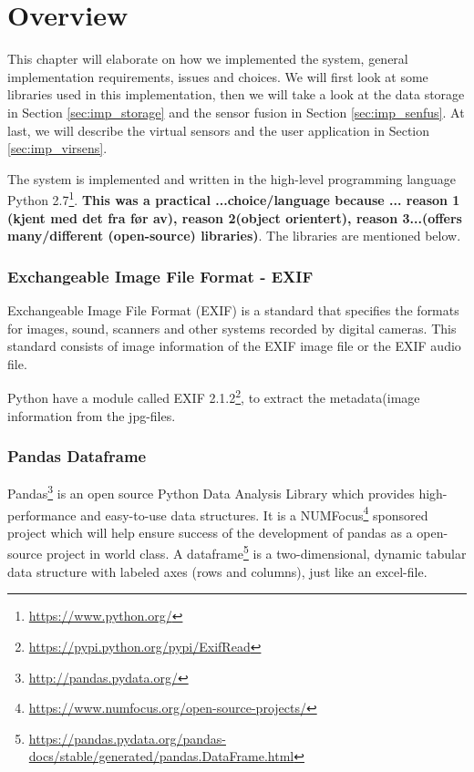 \documentclass[USenglish]{uit-thesis}
\begin{document}
\section{Overview}
This chapter will elaborate on how we implemented the system, general implementation requirements, issues and choices. 
We will first look at some libraries used in this implementation, then we will take a look at the data storage in Section \ref{sec:imp_storage} and the sensor fusion in Section \ref{sec:imp_senfus}. At last, we will describe the virtual sensors and the user application in Section \ref{sec:imp_virsens}.

The system is implemented and written in the high-level programming language Python 2.7\footnote{\url{https://www.python.org/}}. \textbf{ This was a practical ...choice/language because ... reason 1 (kjent med det fra før av), reason 2(object orientert), reason 3...(offers many/different (open-source) libraries)}. The libraries are mentioned below.


\subsubsection{Exchangeable Image File Format - EXIF} \label{sssec:imp_exif}
Exchangeable Image File Format (EXIF) is a standard that specifies the formats for images, sound, scanners and other systems recorded by digital cameras. This standard consists of image information of the EXIF image file or the EXIF audio file.

Python have a module called  EXIF 2.1.2\footnote{\url{https://pypi.python.org/pypi/ExifRead}}, to extract the metadata(image information from the jpg-files.

\subsubsection{Pandas Dataframe} \label{sssec:imp_df}
Pandas\footnote{\url{http://pandas.pydata.org/}} is an open source Python Data Analysis Library which provides high-performance and easy-to-use data structures. It is a NUMFocus\footnote{\url{https://www.numfocus.org/open-source-projects/}} sponsored project which will help ensure success of the development of pandas as a open-source project in world class. A dataframe\footnote{\url{https://pandas.pydata.org/pandas-docs/stable/generated/pandas.DataFrame.html}} is a two-dimensional, dynamic tabular data structure with labeled axes (rows and columns), just like an excel-file.
\end{document}
